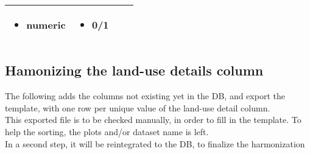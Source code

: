 \documentclass[table]{article}
\providecommand{\tightlist}{%
  \setlength{\itemsep}{0pt}\setlength{\parskip}{0pt}}
\begin{document}
\begin{longtable}[]{@{}llll@{}}
\begin{minipage}[t]{0.24\columnwidth}
\begin{itemize}
\tightlist
\item
  numeric
\end{itemize}\strut
\end{minipage} & \begin{minipage}[t]{0.24\columnwidth}\raggedright\strut
\begin{itemize}
\tightlist
\item
  0/1
\end{itemize}\strut
\end{minipage}\tabularnewline
\bottomrule
\end{longtable}

\subsection{Hamonizing the land-use details
column}\label{hamonizing-the-land-use-details-column}

The following adds the columns not existing yet in the DB, and export
the template, with one row per unique value of the land-use detail
column.\\
This exported file is to be checked manually, in order to fill in the
template. To help the sorting, the plots and/or dataset name is left.\\
In a second step, it will be reintegrated to the DB, to finalize the
harmonization
\end{document}
